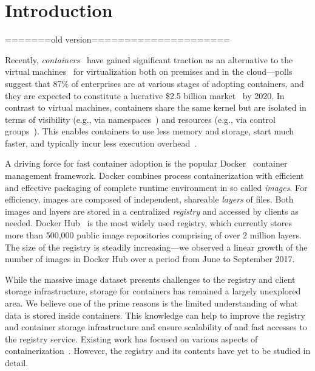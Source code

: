 \section{Introduction}

	
=======old version=====================

Recently, \emph{containers}~\cite{process-containers-linux} have
gained significant traction as an alternative to the virtual
machines~\cite{rosenblum2005virtual} for virtualization both on
premises and in the cloud---polls suggest that 87\% of enterprises are
at various stages of adopting containers, and they are expected to
constitute a lucrative \$2.5 billion
market~\cite{container-grow-by2020} by 2020.
%
In contrast to virtual machines, containers share the same kernel but
are isolated in terms of visibility (e.g., via
namespaces~\cite{man-namespaces}) and resources (e.g., via control
groups~\cite{kernel-doc-cgroups}). This enables containers to use
less memory and storage, start much faster, and typically incur less
execution overhead~\cite{Disco, felter2015updated,
	HypervisorsvsLightweight}.
	
A driving force for fast container
adoption is the popular Docker~\cite{docker} container management
framework. Docker combines process containerization with efficient and
effective packaging  of complete runtime environment
in so called {\em images}.
For efficiency, images are composed of independent,
shareable {\em layers} of files.
%
Both images
and layers are stored in a centralized \emph{registry} and accessed by clients as needed.
%
Docker Hub~\cite{docker-hub} is the most widely used registry, which currently
stores more than 500,000 public image repositories comprising of over 2 million layers.
The size of the registry 
is steadily increasing---we observed a linear growth of the
number of images in Docker Hub over a period from June to September 2017.


While the massive image dataset presents challenges to the registry
and client storage
infrastructure, storage for containers has remained a largely unexplored
area.
%
We believe one of the prime reasons is the limited understanding of what data
is stored inside containers.
%
This knowledge can help to improve the registry and container
storage infrastructure and ensure scalability of and fast accesses to the
registry service.
%
Existing work has focused on various aspects of
containerization~\cite{dockerssd, dockerfinder, analysisdockergithub,
slacker, dockervulnerabile}.
However, the registry and its contents have yet to be studied in detail.

